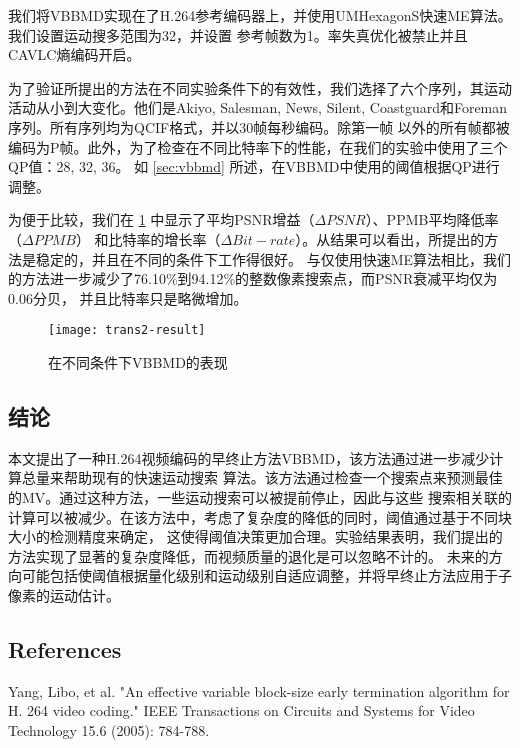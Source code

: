 我们将VBBMD实现在了H.264参考编码器上，并使用UMHexagonS快速ME算法。我们设置运动搜多范围为32，并设置
参考帧数为1。率失真优化被禁止并且CAVLC熵编码开启。

为了验证所提出的方法在不同实验条件下的有效性，我们选择了六个序列，其运动活动从小到大变化。他们是Akiyo, 
Salesman, News, Silent, Coastguard和Foreman序列。所有序列均为QCIF格式，并以30帧每秒编码。除第一帧
以外的所有帧都被编码为P帧。此外，为了检查在不同比特率下的性能，在我们的实验中使用了三个QP值：28, 32, 36。
如 \ref{sec:vbbmd} 所述，在VBBMD中使用的阈值根据QP进行调整。

为便于比较，我们在 \ref{fig:trans2-result} 中显示了平均PSNR增益（$\Delta PSNR$）、PPMB平均降低率（$\Delta PPMB$）
和比特率的增长率（$\Delta Bit-rate$）。从结果可以看出，所提出的方法是稳定的，并且在不同的条件下工作得很好。
与仅使用快速ME算法相比，我们的方法进一步减少了76.10\%到94.12\%的整数像素搜索点，而PSNR衰减平均仅为0.06分贝，
并且比特率只是略微增加。

\begin{figure}[H] %
  \centering
  \texttt{[image: trans2-result]}
  \caption{在不同条件下VBBMD的表现}
  \label{fig:trans2-result}
\end{figure}

\subsection{结论}
\label{sec:app2-conclusion}

本文提出了一种H.264视频编码的早终止方法VBBMD，该方法通过进一步减少计算总量来帮助现有的快速运动搜索
算法。该方法通过检查一个搜索点来预测最佳的MV。通过这种方法，一些运动搜索可以被提前停止，因此与这些
搜索相关联的计算可以被减少。在该方法中，考虑了复杂度的降低的同时，阈值通过基于不同块大小的检测精度来确定，
这使得阈值决策更加合理。实验结果表明，我们提出的方法实现了显著的复杂度降低，而视频质量的退化是可以忽略不计的。
未来的方向可能包括使阈值根据量化级别和运动级别自适应调整，并将早终止方法应用于子像素的运动估计。

\subsection*{References}

\begin{translationbib}
  \item Yang, Libo, et al. "An effective variable block-size early termination algorithm for H. 264 video coding." 
  IEEE Transactions on Circuits and Systems for Video Technology 15.6 (2005): 784-788.
\end{translationbib}
